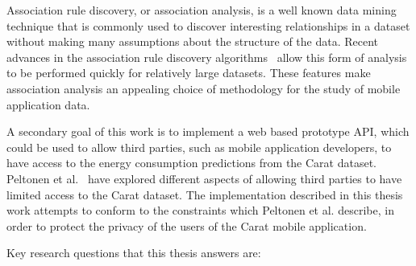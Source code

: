 Association rule discovery, or association analysis, is a well known data mining technique that is commonly used to discover interesting relationships in a dataset without making many assumptions about the structure of the data. Recent advances in the association rule discovery algorithms~\cite{Han:2000:MFP:335191.335372, Li:2008:PPF:1454008.1454027} allow this form of analysis to be performed quickly for relatively large datasets. These features make association analysis an appealing choice of methodology for the study of mobile application data.  

A secondary goal of this work is to implement a web based prototype API, which could be used to allow third parties, such as mobile application developers, to have access to the energy consumption predictions from the Carat dataset. Peltonen et al.~\cite{7840871} have explored different aspects of allowing third parties to have limited access to the Carat dataset. The implementation described in this thesis work attempts to conform to the constraints which Peltonen et al. describe, in order to protect the privacy of the users of the Carat mobile application.        




Key research questions that this thesis answers are:

